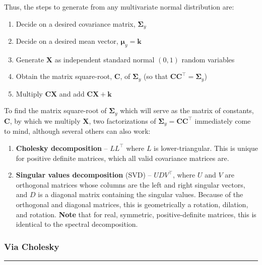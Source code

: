 \documentclass[
]{article}
\begin{document}
Thus, the steps to generate from any multivariate normal distribution
are:

\begin{enumerate}
\def\labelenumi{\arabic{enumi}.}
\item
  Decide on a desired covariance matrix, \(\boldsymbol{\Sigma}_y\)
\item
  Decide on a desired mean vector,
  \(\boldsymbol{\mu}_y = \boldsymbol{k}\)
\item
  Generate \(\boldsymbol{X}\) as independent standard normal \((0,1)\)
  random variables
\item
  Obtain the matrix square-root, \(\boldsymbol{C}\), of
  \(\boldsymbol{\Sigma}_y\) (so that
  \(\boldsymbol{CC}^\top = \boldsymbol{\Sigma}_y\))
\item
  Multiply \(\boldsymbol{CX}\) and add
  \(\boldsymbol{CX} + \boldsymbol{k}\)
\end{enumerate}

To find the matrix square-root of \(\boldsymbol{\Sigma}_y\) which will
serve as the matrix of constants, \(\boldsymbol{C}\), by which we
multiply \(\boldsymbol{X}\), two factorizations of
\(\boldsymbol{\Sigma}_y = \boldsymbol{CC^\top}\) immediately come to
mind, although several others can also work:

\begin{enumerate}
\def\labelenumi{\arabic{enumi}.}
\item
  \textbf{Cholesky decomposition} -- \(LL^\top\) where \(L\) is
  lower-triangular. This is unique for positive definite matrices, which
  all valid covariance matrices are.
\item
  \textbf{Singular values decomposition} (SVD) -- \(UDV^\top\), where
  \(U\) and \(V\) are orthogonal matrices whose columns are the left and
  right singular vectors, and \(D\) is a diagonal matrix containing the
  singular values. Because of the orthogonal and diagonal matrices, this
  is geometrically a rotation, dilation, and rotation. \textbf{Note}
  that for real, symmetric, positive-definite matrices, this is
  identical to the spectral decomposition.
\end{enumerate}

\hfill\break

\hypertarget{via-cholesky}{%
\subsubsection{Via Cholesky}\label{via-cholesky}}

\begin{center}\rule{0.5\linewidth}{0.5pt}\end{center}
\end{document}

